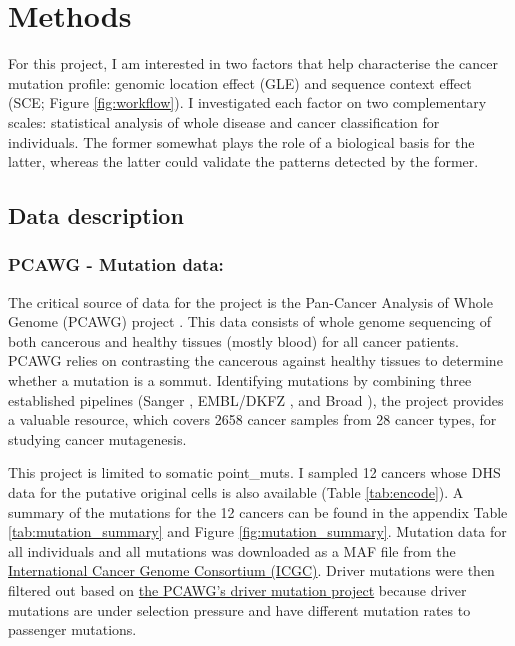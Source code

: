 \chapter{Methods}\label{methods}

For this project, I am interested in two factors that help characterise the cancer mutation profile: genomic location effect (GLE) and sequence context effect (SCE; Figure \ref{fig:workflow}). I investigated each factor on two complementary scales: statistical analysis of whole disease and cancer classification for individuals. The former somewhat plays the role of a biological basis for the latter, whereas the latter could validate the patterns detected by the former.



\section{Data description}
\subsection{PCAWG - Mutation data:} 
The critical source of data for the project is the Pan-Cancer Analysis of Whole Genome (PCAWG) project \citep{Campbell2020}. This data consists of whole genome sequencing of both cancerous and healthy tissues (mostly blood) for all cancer patients. PCAWG relies on contrasting the cancerous against healthy tissues to determine whether a mutation is a \gls{sommut}. Identifying mutations by combining three established pipelines (Sanger \citep{Jones2016CgpCaVEManWrapper:Data}, EMBL/DKFZ \citep{Rimmer2014IntegratingApplications}, and Broad \citep{Cibulskis2013SensitiveSamples}), the project provides a valuable resource, which covers 2658 cancer samples from 28 cancer types, for studying cancer mutagenesis.

This project is limited to somatic \glspl{point_mut}. I sampled 12 cancers whose DHS data for the putative original cells is also available (Table \ref{tab:encode}). A summary of the mutations for the 12 cancers can be found in the appendix Table \ref{tab:mutation_summary} and Figure \ref{fig:mutation_summary}. Mutation data for all individuals and all mutations was downloaded as a MAF file from the \href{https://dcc.icgc.org/releases/PCAWG/consensus_snv_indel}{International Cancer Genome Consortium (ICGC)}. Driver mutations were then filtered out based on \href{https://dcc.icgc.org/releases/PCAWG/driver_mutations}{the PCAWG's driver mutation project} because driver mutations are under selection pressure and have different mutation rates to passenger mutations. 

